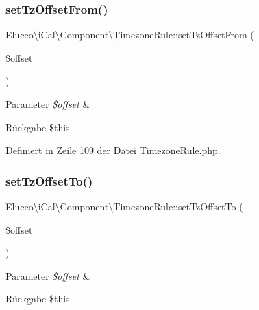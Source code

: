 \subsubsection{\texorpdfstring{set\+Tz\+Offset\+From()}{setTzOffsetFrom()}\hspace{0.1cm}{\footnotesize\ttfamily [3/3]}}
{\footnotesize\ttfamily Eluceo\textbackslash{}i\+Cal\textbackslash{}\+Component\textbackslash{}\+Timezone\+Rule\+::set\+Tz\+Offset\+From (\begin{DoxyParamCaption}\item[{}]{\$offset }\end{DoxyParamCaption})}


\begin{DoxyParams}{Parameter}
{\em \$offset} & \\
\hline
\end{DoxyParams}
\begin{DoxyReturn}{Rückgabe}
\$this 
\end{DoxyReturn}


Definiert in Zeile 109 der Datei Timezone\+Rule.\+php.

\mbox{\label{class_eluceo_1_1i_cal_1_1_component_1_1_timezone_rule_a7e32fa095725379eff54d1c66f9b1b69}} 
\subsubsection{\texorpdfstring{set\+Tz\+Offset\+To()}{setTzOffsetTo()}\hspace{0.1cm}{\footnotesize\ttfamily [1/3]}}
{\footnotesize\ttfamily Eluceo\textbackslash{}i\+Cal\textbackslash{}\+Component\textbackslash{}\+Timezone\+Rule\+::set\+Tz\+Offset\+To (\begin{DoxyParamCaption}\item[{}]{\$offset }\end{DoxyParamCaption})}


\begin{DoxyParams}{Parameter}
{\em \$offset} & \\
\hline
\end{DoxyParams}
\begin{DoxyReturn}{Rückgabe}
\$this 
\end{DoxyReturn}


